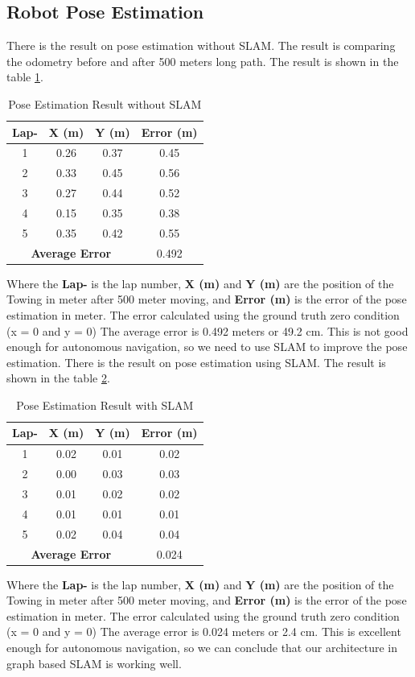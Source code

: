 \documentclass[conference]{IEEEtran}
\begin{document}
\subsection{Robot Pose Estimation} 
There is the result on pose estimation without SLAM. The result is comparing the odometry before and after 500 meters long path. The result is shown in the table \ref{tab:pose_estimation}.
\begin{table}[H]
	\centering
	\caption{Pose Estimation Result without SLAM}
	\label{tab:pose_estimation}
	\begin{tabular}{|c|c|c|c|}
		\hline
		\textbf{Lap-} & \textbf{X (m)} & \textbf{Y (m)} & \textbf{Error (m)} \\ \hline
		1 & 0.26 & 0.37 & 0.45 \\ \hline
		2 & 0.33 & 0.45 & 0.56 \\ \hline
		3 & 0.27 & 0.44 & 0.52 \\ \hline
		4 & 0.15 & 0.35 & 0.38 \\ \hline
		5 & 0.35 & 0.42 & 0.55 \\ \hline
		\multicolumn{3}{|c|}{\textbf{Average Error}} & 0.492 \\ \hline
	\end{tabular}
\end{table}
Where the \textbf{Lap-} is the lap number, \textbf{X (m)} and \textbf{Y (m)} are the position of the Towing in meter after 500 meter moving, and \textbf{Error (m)} is the error of the pose estimation in meter. The error calculated using the ground truth zero condition (x = 0 and y = 0) The average error is 0.492 meters or 49.2 cm. This is not good enough for autonomous navigation, so we need to use SLAM to improve the pose estimation. There is the result on pose estimation using SLAM. The result is shown in the table \ref{tab:pose_estimation_slam}.
\begin{table}[H]
	\centering
	\caption{Pose Estimation Result with SLAM}
	\label{tab:pose_estimation_slam}
	\begin{tabular}{|c|c|c|c|}
		\hline
		\textbf{Lap-} & \textbf{X (m)} & \textbf{Y (m)} & \textbf{Error (m)} \\ \hline
		1 & 0.02 & 0.01 & 0.02 \\ \hline
		2 & 0.00 & 0.03 & 0.03 \\ \hline
		3 & 0.01 & 0.02 & 0.02 \\ \hline
		4 & 0.01 & 0.01 & 0.01 \\ \hline
		5 & 0.02 & 0.04 & 0.04 \\ \hline
		\multicolumn{3}{|c|}{\textbf{Average Error}} & 0.024 \\ \hline
	\end{tabular}
\end{table}
Where the \textbf{Lap-} is the lap number, \textbf{X (m)} and \textbf{Y (m)} are the position of the Towing in meter after 500 meter moving, and \textbf{Error (m)} is the error of the pose estimation in meter. The error calculated using the ground truth zero condition (x = 0 and y = 0) The average error is 0.024 meters or 2.4 cm. This is excellent enough for autonomous navigation, so we can conclude that our architecture in graph based SLAM is working well.
\end{document}

